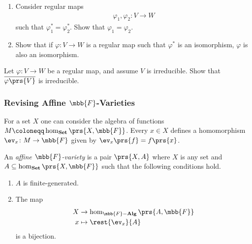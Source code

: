 \documentclass[10pt,a4paper,twoside,openany,hidelinks]{book}
\begin{document}
\begin{exercise}
\begin{enumerate}
\item Consider regular maps
\begin{align*}
\varphi_1,\varphi_2 \colon V \to W
\end{align*}
such that $\varphi_1^* = \varphi_2^*$. Show that $\varphi_1 = \varphi_2$.

\item Show that if $\varphi \colon V \to W$ is a regular map such that $\varphi^*$ is an isomorphism, $\varphi$ is also an isomorphism.
\end{enumerate}
\end{exercise}

\begin{exercise}
Let $\varphi \colon V \to W$ be a regular map, and assume $V$ is irreducible. Show that $\overline{\varphi\prs{V}}$ is irreducible. 
\end{exercise}

\subsubsection{Revising Affine $\mbb{F}$-Varieties}

For a set $X$ one can consider the algebra of functions $M \coloneqq \hom_{\mathbf{Set}}\prs{X,\mbb{F}}$. Every $x \in X$ defines a homomorphism $\ev_x \colon M \to \mbb{F}$ given by $\ev_x\prs{f} = f\prs{x}$.

\begin{definition}
An \emph{affine $\mbb{F}$-variety} is a pair $\prs{X,A}$ where $X$ is any set and $A \subseteq \hom_{\mathbf{Set}}\prs{X,\mbb{F}}$ such that the following conditions hold.

\begin{enumerate}
\item $A$ is finite-generated.
\item The map
\begin{align*}
X &\to \hom_{\mbb{F}\mathbf{-Alg}}\prs{A, \mbb{F}} \\
x &\mapsto \rest{\ev_x}{A}
\end{align*}
is a bijection.
\end{enumerate}
\end{definition}

\backmatter
\end{document}
